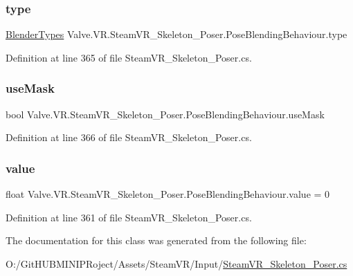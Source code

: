\subsubsection{\texorpdfstring{type}{type}}
{\footnotesize\ttfamily \mbox{\hyperlink{class_valve_1_1_v_r_1_1_steam_v_r___skeleton___poser_1_1_pose_blending_behaviour_a21b1f78c5e6dbf96a079d555954a6ae6}{Blender\+Types}} Valve.\+V\+R.\+Steam\+V\+R\+\_\+\+Skeleton\+\_\+\+Poser.\+Pose\+Blending\+Behaviour.\+type}



Definition at line 365 of file Steam\+V\+R\+\_\+\+Skeleton\+\_\+\+Poser.\+cs.

\mbox{\label{class_valve_1_1_v_r_1_1_steam_v_r___skeleton___poser_1_1_pose_blending_behaviour_acc05cd5cd874696a985e829c7a499b87}} 
\subsubsection{\texorpdfstring{useMask}{useMask}}
{\footnotesize\ttfamily bool Valve.\+V\+R.\+Steam\+V\+R\+\_\+\+Skeleton\+\_\+\+Poser.\+Pose\+Blending\+Behaviour.\+use\+Mask}



Definition at line 366 of file Steam\+V\+R\+\_\+\+Skeleton\+\_\+\+Poser.\+cs.

\mbox{\label{class_valve_1_1_v_r_1_1_steam_v_r___skeleton___poser_1_1_pose_blending_behaviour_a568977e5e79d917cc528f84c97975496}} 
\subsubsection{\texorpdfstring{value}{value}}
{\footnotesize\ttfamily float Valve.\+V\+R.\+Steam\+V\+R\+\_\+\+Skeleton\+\_\+\+Poser.\+Pose\+Blending\+Behaviour.\+value = 0}



Definition at line 361 of file Steam\+V\+R\+\_\+\+Skeleton\+\_\+\+Poser.\+cs.



The documentation for this class was generated from the following file\+:\begin{DoxyCompactItemize}
\item 
O\+:/\+Git\+H\+U\+B\+M\+I\+N\+I\+P\+Roject/\+Assets/\+Steam\+V\+R/\+Input/\mbox{\hyperlink{_steam_v_r___skeleton___poser_8cs}{Steam\+V\+R\+\_\+\+Skeleton\+\_\+\+Poser.\+cs}}\end{DoxyCompactItemize}
